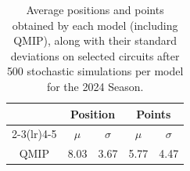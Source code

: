 \begin{table}[H]
\centering
\begin{tabular}{ccccc}
\toprule
\multicolumn{1}{l}{}               & \multicolumn{2}{c}{Position}   & \multicolumn{2}{c}{Points} \\ \cmidrule(lr){2-3}\cmidrule(lr){4-5}
\multicolumn{1}{c}{Model}          &    $\mu$ & $\sigma$ &   $\mu$  & $\sigma$ \\ \midrule
\multicolumn{1}{c}{QMIP          } &     8.03  &     3.67  &     5.77  &     4.47  \\
\bottomrule
\end{tabular}
\caption{Average positions and points obtained by each model (including QMIP), along with their standard deviations on selected circuits after 500 stochastic simulations per model for the 2024 Season.}
\label{tab:tab_qmip_vs_drl_stochastic_2024}
\end{table}